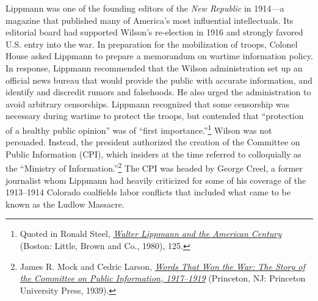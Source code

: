 \documentclass[openany,nobib,twoside,nohyper]{tufte-book}
\begin{document}
Lippmann was one of the founding editors of the \emph{New Republic} in
1914\emph{---}a magazine that published many of America's most
influential intellectuals. Its editorial board had supported Wilson's
re-election in 1916 and strongly favored U.S. entry into the war. In
preparation for the mobilization of troops, Colonel House asked Lippmann
to prepare a memorandum on wartime information policy. In response,
Lippmann recommended that the Wilson administration set up an official
news bureau that would provide the public with accurate information, and
identify and discredit rumors and falsehoods. He also urged the
administration to avoid arbitrary censorships. Lippmann recognized that
some censorship was necessary during wartime to protect the troops, but
contended that ``protection of a healthy public opinion'' was of ``first
importance.''\footnote{Quoted in Ronald Steel,
  \emph{\href{http://www.worldcat.org/oclc/1087969028}{Walter Lippmann
  and the American Century}} (Boston: Little, Brown and Co., 1980), 125.} Wilson was not
persuaded. Instead, the president authorized the creation of the
Committee on Public Information (CPI), which insiders at the time
referred to colloquially as the ``Ministry of
Information.''\footnote{James R. Mock and Cedric Larson,
  \emph{\href{http://www.worldcat.org/oclc/57518482}{Words That Won the
  War: The Story of the Committee on Public Information, 1917--1919}}
  (Princeton, NJ: Princeton University Press, 1939).} The CPI was headed
by George Creel, a former journalist whom Lippmann had heavily
criticized for some of his coverage of the 1913--1914 Colorado
coalfields labor conflicts that included what came to be known as the
Ludlow Massacre.

\enlargethispage{\baselineskip}
\end{document}
